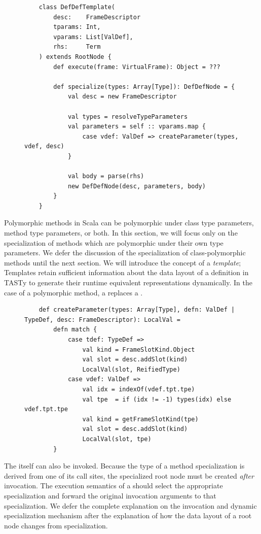 \begin{figure}[!htb]
	\begin{verbatim}
	class DefDefTemplate(
		desc:    FrameDescriptor
		tparams: Int, 
		vparams: List[ValDef], 
		rhs:     Term
	) extends RootNode {
		def execute(frame: VirtualFrame): Object = ???
		
		def specialize(types: Array[Type]): DefDefNode = {
			val desc = new FrameDescriptor
			
			val types = resolveTypeParameters
			val parameters = self :: vparams.map {
				case vdef: ValDef => createParameter(types, vdef, desc)
			}
				
			val body = parse(rhs)
			new DefDefNode(desc, parameters, body)
		}
	}
	\end{verbatim}
\end{figure}

Polymorphic methods in Scala can be polymorphic under class type parameters, method type parameters, or both. 
In this section, we will focus only on the specialization of methods which are polymorphic under their own type parameters.
We defer the discussion of the specialization of class-polymorphic methods until the next section.
We will introduce the concept of a \textit{template}; Templates retain sufficient information about the data layout of a definition in TASTy to generate their runtime equivalent representations dynamically.
In the case of a polymorphic method, a  replaces a .

\begin{figure}[!htb]
	\begin{verbatim}
	def createParameter(types: Array[Type], defn: ValDef | TypeDef, desc: FrameDescriptor): LocalVal = 
		defn match {
			case tdef: TypeDef => 
				val kind = FrameSlotKind.Object
				val slot = desc.addSlot(kind)
				LocalVal(slot, ReifiedType)
			case vdef: ValDef => 
				val idx = indexOf(vdef.tpt.tpe)
				val tpe  = if (idx != -1) types(idx) else vdef.tpt.tpe
				val kind = getFrameSlotKind(tpe)
				val slot = desc.addSlot(kind)
				LocalVal(slot, tpe)
		}
	\end{verbatim}
\end{figure}

The  itself can also be invoked.
Because the type of a method specialization is derived from one of its call sites, the specialized root node must be created \textit{after} invocation.
The execution semantics of a  should select the appropriate specialization and forward the original invocation arguments to that specialization.
We defer the complete explanation on the invocation and dynamic specialization mechanism after the explanation of how the data layout of a root node changes from specialization.

